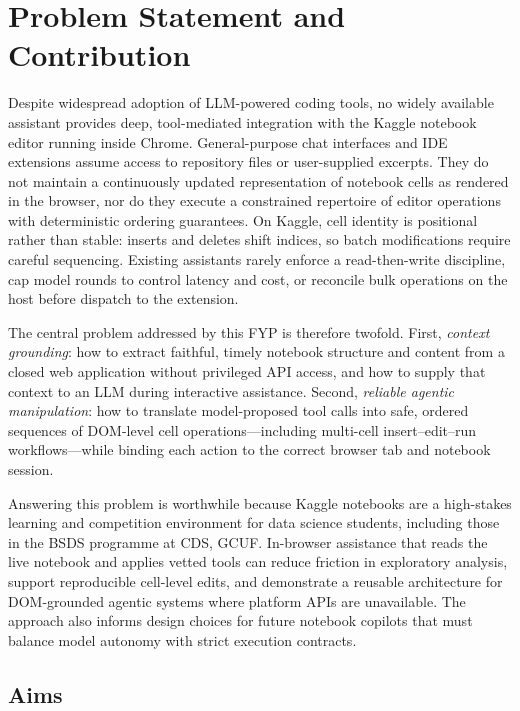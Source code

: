 \section{Problem Statement and Contribution}
\label{sec:problem-statement}

Despite widespread adoption of \ac{LLM}-powered coding tools, no widely available assistant provides deep, tool-mediated integration with the Kaggle notebook editor running inside Chrome. General-purpose chat interfaces and IDE extensions assume access to repository files or user-supplied excerpts. They do not maintain a continuously updated representation of notebook cells as rendered in the browser, nor do they execute a constrained repertoire of editor operations with deterministic ordering guarantees. On Kaggle, cell identity is positional rather than stable: inserts and deletes shift indices, so batch modifications require careful sequencing. Existing assistants rarely enforce a read-then-write discipline, cap model rounds to control latency and cost, or reconcile bulk operations on the host before dispatch to the extension.

The central problem addressed by this FYP is therefore twofold. First, \emph{context grounding}: how to extract faithful, timely notebook structure and content from a closed web application without privileged \ac{API} access, and how to supply that context to an \ac{LLM} during interactive assistance. Second, \emph{reliable agentic manipulation}: how to translate model-proposed tool calls into safe, ordered sequences of DOM-level cell operations---including multi-cell insert--edit--run workflows---while binding each action to the correct browser tab and notebook session.

Answering this problem is worthwhile because Kaggle notebooks are a high-stakes learning and competition environment for data science students, including those in the \acf{BSDS} programme at \acf{CDS}, \acf{GCUF}. In-browser assistance that reads the live notebook and applies vetted tools can reduce friction in exploratory analysis, support reproducible cell-level edits, and demonstrate a reusable architecture for DOM-grounded agentic systems where platform \acp{API} are unavailable. The approach also informs design choices for future notebook copilots that must balance model autonomy with strict execution contracts.

\subsection{Aims}
\label{sec:aims}

